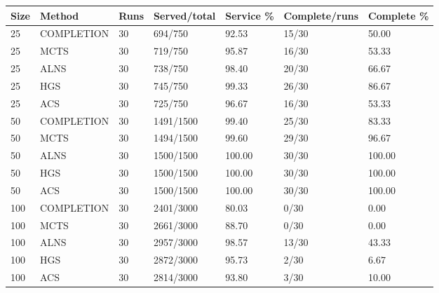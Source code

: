 \begin{tabular}{lllllll}
\hline
Size & Method & Runs & Served/total & Service \% & Complete/runs & Complete \% \\
\hline
25 & COMPLETION & 30 & 694/750 & 92.53 & 15/30 & 50.00 \\
25 & MCTS & 30 & 719/750 & 95.87 & 16/30 & 53.33 \\
25 & ALNS & 30 & 738/750 & 98.40 & 20/30 & 66.67 \\
25 & HGS & 30 & 745/750 & 99.33 & 26/30 & 86.67 \\
25 & ACS & 30 & 725/750 & 96.67 & 16/30 & 53.33 \\
50 & COMPLETION & 30 & 1491/1500 & 99.40 & 25/30 & 83.33 \\
50 & MCTS & 30 & 1494/1500 & 99.60 & 29/30 & 96.67 \\
50 & ALNS & 30 & 1500/1500 & 100.00 & 30/30 & 100.00 \\
50 & HGS & 30 & 1500/1500 & 100.00 & 30/30 & 100.00 \\
50 & ACS & 30 & 1500/1500 & 100.00 & 30/30 & 100.00 \\
100 & COMPLETION & 30 & 2401/3000 & 80.03 & 0/30 & 0.00 \\
100 & MCTS & 30 & 2661/3000 & 88.70 & 0/30 & 0.00 \\
100 & ALNS & 30 & 2957/3000 & 98.57 & 13/30 & 43.33 \\
100 & HGS & 30 & 2872/3000 & 95.73 & 2/30 & 6.67 \\
100 & ACS & 30 & 2814/3000 & 93.80 & 3/30 & 10.00 \\
\hline
\end{tabular}
